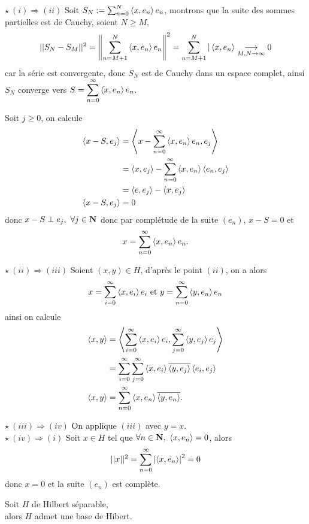 \documentclass[a4paper,11pt, twoside]{article}
\begin{document}
\begin{Proof}
  $\star\ (i)\Rightarrow(ii)$ Soit $S_N:=\sum_{n=0}^N\left\langle x,e_n \right\rangle e_n$, montrons que la suite des sommes partielles est de Cauchy, soient $N\geqslant M$,
  $$||S_N-S_M||^2=\left\lVert\sum_{n=M+1}^N\left\langle x,e_n \right\rangle e_n\right\rVert^2=\sum_{n=M+1}^N|\left\langle x,e_n \right\rangle\underset{M,N\to\infty}{\longrightarrow}0$$
  car la série est convergente, donc $S_N$ est de Cauchy dans un espace complet, ainsi $S_N$ converge vers $\displaystyle S=\displaystyle\sum_{n=0}^\infty\left\langle x,e_n \right\rangle e_n$.

  Soit $j\geqslant 0$, on calcule
  \begin{align*}
    \left\langle x-S,e_j \right\rangle&=\left\langle x-\displaystyle\sum_{n=0}^\infty\left\langle x,e_n \right\rangle e_n,e_j \right\rangle\\
    &=\left\langle x,e_j \right\rangle-\sum_{n=0}^\infty\left\langle x,e_n \right\rangle\left\langle e_n,e_j \right\rangle\\
    &=\left\langle e,e_j \right\rangle-\left\langle x,e_j \right\rangle\\
    \left\langle x-S,e_j \right\rangle&=0
  \end{align*}
  donc $x-S\perp e_j,\ \forall j\in\N$ donc par complétude de la suite $(e_n)$, $x-S=0$ et 
  $$x=\displaystyle\sum_{n=0}^\infty\left\langle x,e_n \right\rangle e_n.$$

  $\star\ (ii)\Rightarrow (iii)$ Soient $(x,y)\in H$, d'après le point $(ii)$, on a alors 
  $$x=\displaystyle\sum_{i=0}^\infty\left\langle x,e_i \right\rangle e_i\text{ et }y=\displaystyle\sum_{n=0}^\infty\left\langle y,e_n \right\rangle e_n$$
  ainsi on calcule
  \begin{align*}
    \left\langle x,y \right\rangle&=\left\langle \displaystyle\sum_{i=0}^\infty\left\langle x,e_i \right\rangle e_i,\displaystyle\sum_{j=0}^\infty\left\langle y,e_j \right\rangle e_j \right\rangle\\
    &=\displaystyle\sum_{i=0}^\infty\sum_{j=0}^\infty\left\langle x,e_i \right\rangle\overline{\left\langle y,e_j \right\rangle}\left\langle e_i,e_j \right\rangle\\
    \left\langle x,y \right\rangle&=\displaystyle\sum_{n=0}^\infty\left\langle x,e_n \right\rangle\overline{\left\langle y,e_n \right\rangle}.
  \end{align*}

  $\star\ (iii)\Rightarrow(iv)$ On applique $(iii)$ avec $y=x$.\\

  $\star\ (iv)\Rightarrow(i)$ Soit $x\in H$ tel que $\forall n\in\N,\ \ps{x,e_n}=0$, alors 
  $$||x||^2=\sum_{n=0}^\infty\left| \left\langle x,e_n \right\rangle\right|^2=0$$
  donc $x=0$ et la suite $(e_n)$ est complète.
\end{Proof}


\begin{Th}
  Soit $H$ de Hilbert séparable,\\
  
  alors $H$ admet une base de Hibert.
\end{Th}
\end{document}
